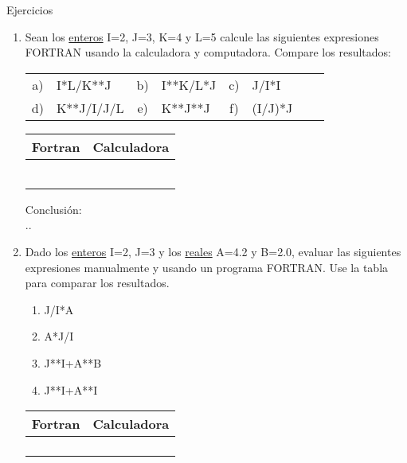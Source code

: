 \documentclass[11pt]{exam}
\begin{document}
\large{Ejercicios}
\begin{enumerate}
 \item 
Sean los \underline{enteros} I=2, J=3, K=4 y L=5 calcule las siguientes expresiones FORTRAN usando la calculadora y  computadora. Compare los resultados:\\
\begin{tabular}{clclclcl}
      a)& I*L/K**J & b)&  I**K/L*J &c)&  J/I*I \\
      d)&  K**J/I/J/L &e)& K**J**J  &f)&   (I/J)*J   \\
\end{tabular}
\begin{minipage}{5cm}
\begin{tabular}{|p{3cm}|p{3cm}|}
\hline 
 Fortran& Calculadora\\ \hline \hline
 &\\ \hline
 &\\ \hline
 &\\ \hline
&\\ \hline
 &\\ \hline
&\\ \hline
\end{tabular}

\end{minipage}
\par
Conclusi\'on: \dotfill \\
..\dotfill
 
 \item 
Dado los \underline{enteros} I=2, J=3 y los \underline{reales} A=4.2 y B=2.0, evaluar las siguientes 
expresiones manualmente y usando un programa FORTRAN. Use la tabla para comparar los resultados.\\
\begin{minipage}{5cm}
\vspace{0.5cm}
   \begin{enumerate}
	\item  J/I*A
	\item  A*J/I
	\item J**I+A**B
	\item J**I+A**I
    \end{enumerate}
\end{minipage}
\begin{minipage}{5cm}
\begin{tabular}{|p{3cm}|p{3cm}|}
\hline 
 Fortran& Calculadora\\ \hline \hline
 &\\ \hline
 &\\ \hline
 &\\ \hline
&\\ \hline
\end{tabular}


\end{minipage}
\end{enumerate}
\end{document}
